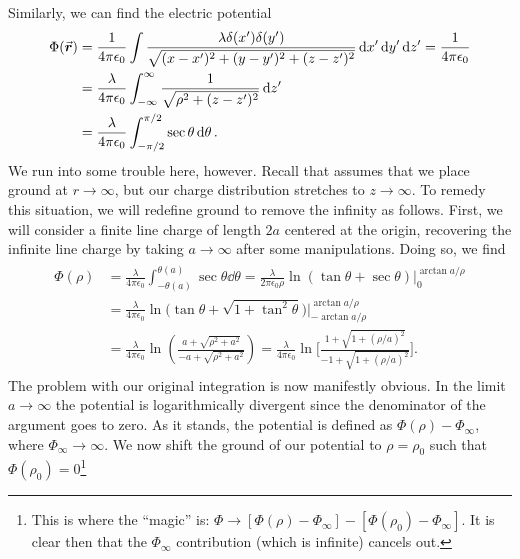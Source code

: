 {Similarly, we can find the electric potential
\begin{eqnarray}
    \begin{aligned}
        \Phi(\va*{r}) &= \frac{1}{4 \pi \epsilon_0} \int \frac{\lambda \delta(x') \delta(y')}{\sqrt{(x - x')^2 + (y - y')^2 + (z - z')^2}} \dd{x'} \dd{y'} \dd{z'} = \frac{1}{4 \pi \epsilon_0} \\
                      &= \frac{\lambda}{4 \pi \epsilon_0} \int_{-\infty}^{\infty} \frac{1}{\sqrt{\rho^2 + (z - z')^2}} \dd{z'} \\
                      &= \frac{\lambda}{4 \pi \epsilon_0} \int_{-\pi/2}^{\pi/2} \sec{\theta} \dd{\theta}
    .\end{aligned}
\end{eqnarray}
We run into some trouble here, however.
Recall that  assumes that we place ground at $r \rightarrow \infty$, but our charge distribution stretches to $z \rightarrow \infty$.
To remedy this situation, we will redefine ground to remove the infinity as follows.
First, we will consider a finite line charge of length $2a$ centered at the origin, recovering the infinite line charge by taking $a \rightarrow \infty$ after some manipulations.
Doing so, we find
\begin{eqnarray}
    \begin{aligned}
        \Phi(\rho) &= \frac{\lambda}{4 \pi \epsilon_0} \int_{-\theta(a)}^{\theta(a)} \sec{\theta} \dd{\theta} = \frac{\lambda}{2 \pi \epsilon_0 \rho} \ln{(\tan{\theta} + \sec{\theta})} \Big|_{0}^{\arctan{a/\rho}} \\
        &= \frac{\lambda}{4 \pi \epsilon_0} \ln{\Big( \tan{\theta} + \sqrt{1 + \tan^2{\theta}} \Big)} \Big|_{-\arctan{a/\rho}}^{\arctan{a/\rho}} \\
        &= \frac{\lambda}{4 \pi \epsilon_0} \ln( \frac{a + \sqrt{ \rho^2 + a^2 }}{-a + \sqrt{\rho^2 + a^2}} ) = \frac{\lambda}{4 \pi \epsilon_0} \ln\Bigg[ \frac{1 + \sqrt{1 + ( \rho/a )^2}}{-1 + \sqrt{1 + ( \rho/a )^2}} \Bigg]
    .\end{aligned}
\end{eqnarray}
The problem with our original integration is now manifestly obvious.
In the limit $a \rightarrow \infty$ the potential is logarithmically divergent since the denominator of the argument goes to zero.
As it stands, the potential is defined as $\Phi(\rho) - \Phi_{\infty}$, where $\Phi_{\infty} \rightarrow \infty$.
We now shift the ground of our potential to $\rho = \rho_0$ such that $\Phi(\rho_0) = 0$\footnote{This is where the ``magic'' is: $\Phi \rightarrow [ \Phi(\rho) - \Phi_{\infty}] - [\Phi(\rho_{0}) - \Phi_{\infty}]$. It is clear then that the $\Phi_{\infty}$ contribution (which is infinite) cancels out.}
}
